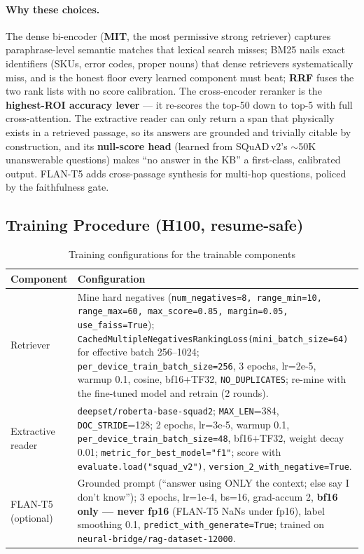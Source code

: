\documentclass[12pt,a4paper]{article}
\begin{document}
\paragraph{Why these choices.} The dense bi-encoder (\textbf{MIT}, the most permissive strong retriever) captures paraphrase-level semantic matches that lexical search misses; BM25 nails exact identifiers (SKUs, error codes, proper nouns) that dense retrievers systematically miss, and is the honest floor every learned component must beat; \textbf{RRF} fuses the two rank lists with no score calibration. The cross-encoder reranker is the \textbf{highest-ROI accuracy lever} --- it re-scores the top-50 down to top-5 with full cross-attention. The extractive reader can only return a span that physically exists in a retrieved passage, so its answers are grounded and trivially citable by construction, and its \textbf{null-score head} (learned from SQuAD\,v2's $\sim$50K unanswerable questions) makes ``no answer in the KB'' a first-class, calibrated output. FLAN-T5 adds cross-passage synthesis for multi-hop questions, policed by the faithfulness gate.

\subsection{Training Procedure (H100, resume-safe)}

\begin{table}[H]
\centering
\caption{Training configurations for the trainable components}
\small
\begin{tabularx}{\linewidth}{@{} l L @{}}
\toprule
\textbf{Component} & \textbf{Configuration} \\
\midrule
Retriever & Mine hard negatives (\texttt{num\_negatives=8, range\_min=10, range\_max=60, max\_score=0.85, margin=0.05, use\_faiss=True}); \texttt{CachedMultipleNegativesRankingLoss(mini\_batch\_size=64)} for effective batch 256--1024; \texttt{per\_device\_train\_batch\_size=256}, 3 epochs, lr=2e-5, warmup 0.1, cosine, bf16$+$TF32, \texttt{NO\_DUPLICATES}; re-mine with the fine-tuned model and retrain (2 rounds). \\
Extractive reader & \texttt{deepset/roberta-base-squad2}; \texttt{MAX\_LEN}=384, \texttt{DOC\_STRIDE}=128; 2 epochs, lr=3e-5, warmup 0.1, \texttt{per\_device\_train\_batch\_size=48}, bf16$+$TF32, weight decay 0.01; \texttt{metric\_for\_best\_model="f1"}; score with \texttt{evaluate.load("squad\_v2")}, \texttt{version\_2\_with\_negative=True}. \\
FLAN-T5 (optional) & Grounded prompt (``answer using ONLY the context; else say I don't know''); 3 epochs, lr=1e-4, bs=16, grad-accum 2, \textbf{bf16 only --- never fp16} (FLAN-T5 NaNs under fp16), label smoothing 0.1, \texttt{predict\_with\_generate=True}; trained on \texttt{neural-bridge/rag-dataset-12000}. \\
\bottomrule
\end{tabularx}
\end{table}
\end{document}
